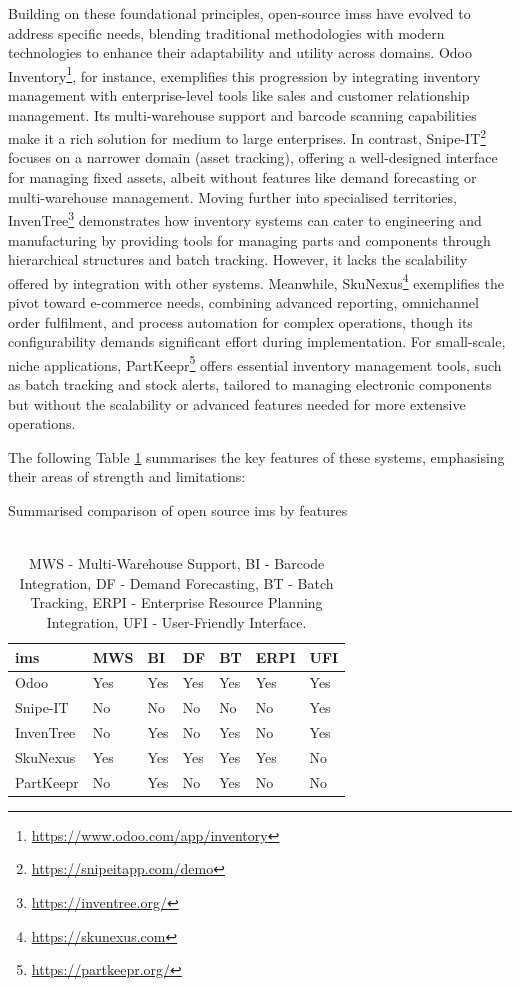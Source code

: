 Building on these foundational principles, open-source \acp{ims} have evolved to address specific needs, blending traditional methodologies with modern technologies to enhance their adaptability and utility across domains. Odoo Inventory\footnote{\url{https://www.odoo.com/app/inventory}}, for instance, exemplifies this progression by integrating inventory management with enterprise-level tools like sales and customer relationship management. Its multi-warehouse support and barcode scanning capabilities make it a rich solution for medium to large enterprises. In contrast, Snipe-IT\footnote{\url{https://snipeitapp.com/demo}} focuses on a narrower domain (asset tracking), offering a well-designed interface for managing fixed assets, albeit without features like demand forecasting or multi-warehouse management. Moving further into specialised territories, InvenTree\footnote{\url{https://inventree.org/}} demonstrates how inventory systems can cater to engineering and manufacturing by providing tools for managing parts and components through hierarchical structures and batch tracking. However, it lacks the scalability offered by integration with other systems. Meanwhile, SkuNexus\footnote{\url{https://skunexus.com}} exemplifies the pivot toward e-commerce needs, combining advanced reporting, omnichannel order fulfilment, and process automation for complex operations, though its configurability demands significant effort during implementation. For small-scale, niche applications, PartKeepr\footnote{\url{https://partkeepr.org/}} offers essential inventory management tools, such as batch tracking and stock alerts, tailored to managing electronic components but without the scalability or advanced features needed for more extensive operations.

The following Table \ref{tab:ims_comparison} summarises the key features of these systems, emphasising their areas of strength and limitations:

\begin{table}[!htb]
\centering
\caption{Summarised comparison of open source \acl{ims} by features}
\begin{tabular}{lllllll}
\hline
\textbf{\ac{ims}} & \textbf{MWS} & \textbf{BI} & \textbf{DF} & \textbf{BT} & \textbf{ERPI} & \textbf{UFI} \\
\hline
Odoo & Yes & Yes & Yes & Yes & Yes & Yes \\
\hline
Snipe-IT & No & No & No & No & No & Yes \\
\hline
InvenTree & No & Yes & No & Yes & No & Yes \\
\hline
SkuNexus & Yes & Yes & Yes & Yes & Yes & No \\
\hline
PartKeepr & No & Yes & No & Yes & No & No \\
\hline
\end{tabular}
\caption*{\\MWS - Multi-Warehouse Support, BI - Barcode Integration, DF - Demand Forecasting, BT - Batch Tracking, ERPI - Enterprise Resource Planning Integration, UFI - User-Friendly Interface.}
\label{tab:ims_comparison}
\end{table}

